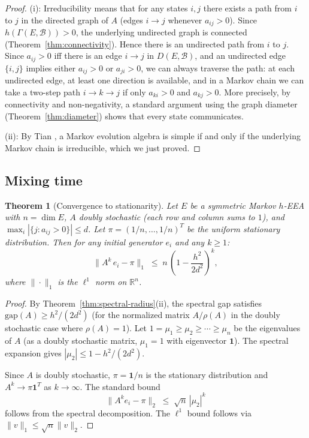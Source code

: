 \documentclass[12pt,a4paper]{amsart}
\newtheorem{theorem}{Theorem}[section]
\theoremstyle{definition}
\newcommand{\R}{\mathbb{R}}
\newcommand{\hh}{h}          %
\newcommand{\EA}{E}          %
\newcommand{\natbasis}{\mathcal{B}}  %
\newcommand{\strmat}{A}      %
\begin{document}
\begin{proof}
(i): Irreducibility means that for any states $i,j$ there exists a path
from $i$ to $j$ in the directed graph of $\strmat$ (edges $i\to j$
whenever $a_{ij}>0$).  Since $\hh(\varGamma(\EA,\natbasis))>0$, the
underlying undirected graph is connected
(Theorem~\ref{thm:connectivity}).  Hence there is an undirected path
from $i$ to $j$.  Since $a_{ij}>0$ iff there is an edge $i\to j$ in
$D(\EA,\natbasis)$, and an undirected edge $\{i,j\}$ implies either
$a_{ij}>0$ or $a_{ji}>0$, we can always traverse the path:
at each undirected edge, at least one direction is available, and in a
Markov chain we can take a two-step path $i\to k\to j$ if only $a_{ki}>0$
and $a_{kj}>0$.  More precisely, by connectivity and non-negativity, a
standard argument using the graph diameter (Theorem~\ref{thm:diameter})
shows that every state communicates.

(ii): By Tian \cite[Chapter~4]{Tian2008}, a Markov evolution algebra is
simple if and only if the underlying Markov chain is irreducible, which
we just proved.
\end{proof}

\subsection{Mixing time}

\begin{theorem}[Convergence to stationarity]\label{thm:mixing}
Let $\EA$ be a symmetric Markov $h$-EEA with $n=\dim\EA$, $\strmat$
doubly stochastic (each row and column sums to $1$), and
$\max_i|\{j:a_{ij}>0\}|\le d$.  Let $\pi=(1/n,\ldots,1/n)^T$ be the
uniform stationary distribution.  Then for any initial generator $e_i$
and any $k\ge 1$:
\[
  \bigl\|\strmat^k\,e_i - \pi\bigr\|_1
  \;\le\;
  n\,\left(1-\frac{h^2}{2d^2}\right)^k,
\]
where $\|\cdot\|_1$ is the $\ell^1$ norm on $\R^n$.
\end{theorem}

\begin{proof}
By Theorem~\ref{thm:spectral-radius}(ii), the spectral gap satisfies
$\mathrm{gap}(\strmat)\ge h^2/(2d^2)$ (for the normalized matrix
$\strmat/\rho(\strmat)$ in the doubly stochastic case where
$\rho(\strmat)=1$).  Let $1=\mu_1\ge\mu_2\ge\cdots\ge\mu_n$ be the
eigenvalues of $\strmat$ (as a doubly stochastic matrix, $\mu_1=1$ with
eigenvector $\mathbf{1}$).  The spectral expansion gives
$|\mu_2|\le 1-h^2/(2d^2)$.

Since $\strmat$ is doubly stochastic, $\pi=\mathbf{1}/n$ is the
stationary distribution and $\strmat^k\to\pi\mathbf{1}^T$ as
$k\to\infty$.  The standard bound
\[
  \|\strmat^k e_i - \pi\|_2 \;\le\;
  \sqrt{n}\,|\mu_2|^k
\]
follows from the spectral decomposition.  The $\ell^1$ bound follows via
$\|v\|_1\le\sqrt{n}\|v\|_2$.
\end{proof}
\end{document}
